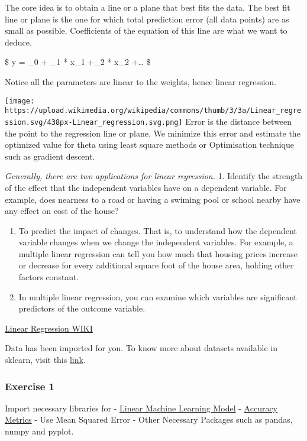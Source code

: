 \documentclass[11pt]{article}
\makeatletter
\def\maxwidth{\ifdim\Gin@nat@width>\linewidth\linewidth
    \else\Gin@nat@width\fi}
\let\Oldincludegraphics\includegraphics
\renewcommand{\includegraphics}[1]{\Oldincludegraphics[width=.8\maxwidth]{#1}}
\makeatother
\begin{document}
The core idea is to obtain a line or a plane that best fits the data.
The best fit line or plane is the one for which total prediction error
(all data points) are as small as possible. Coefficients of the equation
of this line are what we want to deduce.

\$ y = \Theta\_0 + \Theta\_1 * x\_1 +\Theta\_2 * x\_2 +\ldots{} \$

Notice all the parameters are linear to the weights, hence linear
regression.

\texttt{[image: https://upload.wikimedia.org/wikipedia/commons/thumb/3/3a/Linear\_regression.svg/438px-Linear\_regression.svg.png]}
Error is the distance between the point to the regression line or plane.
We minimize this error and estimate the optimized value for theta using
least square methods or Optimisation technique such as gradient descent.

\emph{Generally, there are two applications for linear regression.} 1.
Identify the strength of the effect that the independent variables have
on a dependent variable. For example, does nearness to a road or having
a swiming pool or school nearby have any effect on cost of the house?

\begin{enumerate}
\def\labelenumi{\arabic{enumi}.}
\setcounter{enumi}{1}
\item
  To predict the impact of changes. That is, to understand how the
  dependent variable changes when we change the independent variables.
  For example, a multiple linear regression can tell you how much that
  housing prices increase or decrease for every additional square foot
  of the house area, holding other factors constant.
\item
  In multiple linear regression, you can examine which variables are
  significant predictors of the outcome variable.
\end{enumerate}

\href{https://en.wikipedia.org/wiki/Linear_regression}{Linear Regression
WIKI}

    Data has been imported for you. To know more about datasets available in
sklearn, visit this
\href{http://scikit-learn.org/stable/datasets/index.html}{link}.

    \hypertarget{exercise-1}{%
\subsubsection{Exercise 1}\label{exercise-1}}

Import necessary libraries for -
\href{http://scikit-learn.org/stable/modules/linear_model.html}{Linear
Machine Learning Model} -
\href{http://scikit-learn.org/stable/modules/classes.html\#module-sklearn.metrics}{Accuracy
Metrics} - Use Mean Squared Error - Other Necessary Packages such as
pandas, numpy and pyplot.
\end{document}
